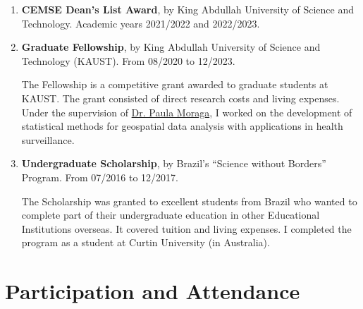 \documentclass[10pt, ]{article}
\begin{document}
	\begin{enumerate}[noitemsep, topsep=0pt]
		\item \textbf{CEMSE Dean's List Award}, by King Abdullah University of Science and Technology. Academic years 2021/2022 and 2022/2023.
		
		\item \textbf{Graduate Fellowship}, by King Abdullah University of Science and Technology (KAUST). From 08/2020 to 12/2023. \vspace{3pt}
		
		The Fellowship is a competitive grant awarded to graduate students at KAUST. The grant consisted of direct research costs and living expenses. Under the supervision of \href{https://www.paulamoraga.com/}{Dr. Paula Moraga}, I  worked on the development of statistical methods for geospatial data analysis with applications in health surveillance. \vspace{3pt}
		
		\item \textbf{Undergraduate Scholarship}, by Brazil's ``Science without Borders'' Program. From 07/2016 to 12/2017.\vspace{3pt}
		
		The Scholarship was granted to excellent students from Brazil who wanted to complete part of their undergraduate education in other Educational Institutions overseas. It covered tuition and living expenses. I completed the program as a student at Curtin University (in Australia).
		
	\end{enumerate}
	
	\vspace{10pt}
	
	\vspace{-12pt}
	\section*{Participation and Attendance} \vspace{-5pt}
	
\end{document}
